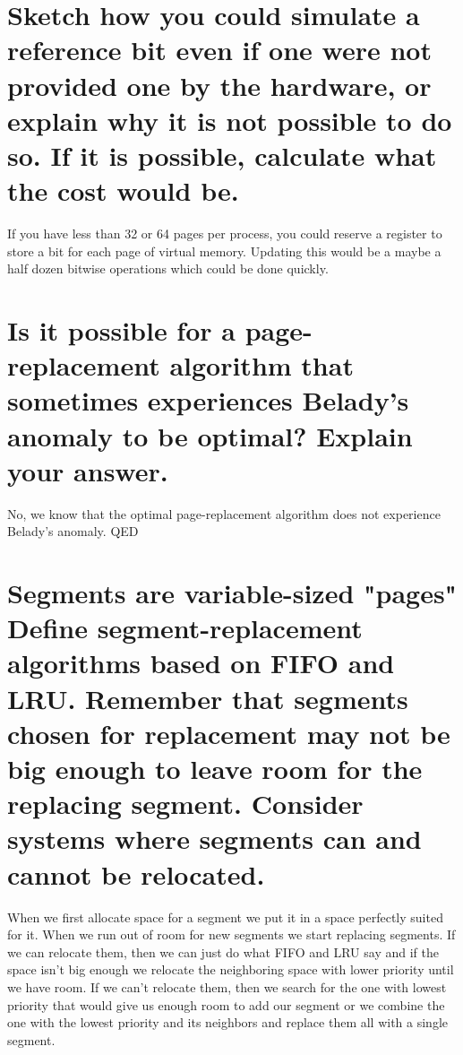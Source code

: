 \documentclass{book}%
\begin{document}
\section{Sketch how you could simulate a reference bit even if one were not
provided one by the hardware, or explain why it is not possible to do so. If it
is possible, calculate what the cost would be.}
If you have less than 32 or 64 pages per process, you could reserve a register
to store a bit for each page of virtual memory. Updating this would be a maybe a
half dozen bitwise operations which could be done quickly.
\section{Is it possible for a page-replacement algorithm that sometimes
experiences Belady's anomaly to be optimal? Explain your answer.}
No, we know that the optimal page-replacement algorithm does not experience
Belady's anomaly. \textsc{QED}
\section{Segments are variable-sized "pages" Define segment-replacement
algorithms based on FIFO and LRU. Remember that segments chosen for replacement
may not be big enough to leave room for the replacing segment. Consider systems
where segments can and cannot be relocated.}
When we first allocate space for a segment we put it in a space perfectly suited
for it. When we run out of room for new segments we start replacing segments. If
we can relocate them, then we can just do what FIFO and LRU say and if the space
isn't big enough we relocate the neighboring space with lower priority until we
have room. If we can't relocate them, then we search for the one with lowest
priority that would give us enough room to add our segment or we combine the
one with the lowest priority and its neighbors and replace them all with a
single segment.
\end{document}
